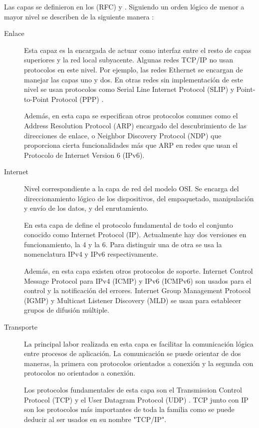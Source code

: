 Las capas se definieron en los  (RFC)
\cite{rfc1122} y \cite{rfc1123}. Siguiendo un orden lógico de menor a mayor
nivel se describen de la siguiente manera \cite{kozierok2005}:
\begin{description}
  \item[Enlace] Esta capaz es la encargada de actuar como interfaz entre el
  resto de capas superiores y la red local subyacente. Algunas redes TCP/IP no 
  usan protocolos en este nivel. Por ejemplo, las redes Ethernet se encargan de
  manejar las capas uno y dos. En otras redes sin implementación de este nivel
  se usan protocolos como Serial Line Internet Protocol (SLIP) \cite{rfc1055} y
  Point-to-Point Protocol (PPP) \cite{rfc1661}.

  Además, en esta capa se especifican otros protocolos comunes como el Address
  Resolution Protocol (ARP) \cite{rfc826} encargado del descubrimiento de las
  direcciones de enlace, o Neighbor Discovery Protocol (NDP) \cite{rfc4861} que
  proporciona cierta funcionalidades más que ARP en redes que usan el
  Protocolo de Internet Version 6 (IPv6).

  \item[Internet] Nivel correspondiente a la capa de red del modelo OSI. Se
  encarga del direccionamiento lógico de los dispositivos, del empaquetado,
  manipulación y envío de los datos, y del enrutamiento.
  
  En esta capa de define el protocolo fundamental de todo el conjunto conocido
  como Internet Protocol (IP). Actualmente hay dos versiones en funcionamiento,
  la 4 y la 6. Para distinguir una de otra se usa la nomenclatura IPv4
  \cite{rfc791} y IPv6 \cite{rfc2460} respectivamente.

  Además, en esta capa existen otros protocolos de soporte. Internet Control
  Message Protocol para IPv4 (ICMP) \cite{rfc792} y IPv6 (ICMPv6) \cite{rfc4443}
  son usados para el control y la notificación del errores. Internet Group
  Management Protocol (IGMP) \cite{rfc4604} y Multicast Listener Discovery (MLD)
  \cite{rfc4604} se usan para establecer grupos de difusión múltiple.

  \item[Transporte] La principal labor realizada en esta capa es facilitar
  la comunicación lógica entre procesos de aplicación. La comunicación se puede
  orientar de dos maneras, la primera con protocolos orientados a conexión y la
  segunda con protocolos no orientados a conexión.

  Los protocolos fundamentales de esta capa son el Transmission Control Protocol
  (TCP) \cite{rfc793} y el User Datagram Protocol (UDP) \cite{rfc768}.
  TCP junto con IP son los protocolos más importantes de toda la familia como se
  puede deducir al ser usados en su nombre "TCP/IP".


\end{description}
